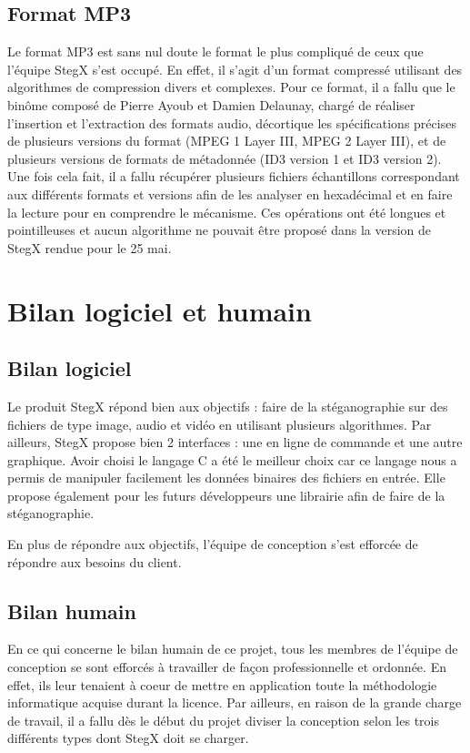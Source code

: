 \documentclass[11pt]{article}
\begin{document}
\subsection{Format MP3}

Le format MP3 est sans nul doute le format le plus compliqué de ceux que
l'équipe StegX s'est occupé. En effet, il s'agit d'un format compressé utilisant
des algorithmes de compression divers et complexes. Pour ce format, il a fallu
que le binôme composé de Pierre Ayoub et Damien Delaunay, chargé de réaliser
l'insertion et l'extraction des formats audio, décortique les spécifications
précises de plusieurs versions du format (MPEG 1 Layer III, MPEG 2 Layer III),
et de plusieurs versions de formats de métadonnée (ID3 version 1 et ID3 version
2). Une fois cela fait, il a fallu récupérer plusieurs fichiers échantillons
correspondant aux différents formats et versions afin de les analyser en
hexadécimal et en faire la lecture pour en comprendre le mécanisme. Ces
opérations ont été longues et pointilleuses et aucun algorithme ne pouvait être
proposé dans la version de StegX rendue pour le 25 mai. 

\section{Bilan logiciel et humain}

\subsection{Bilan logiciel}

Le produit StegX répond bien aux objectifs : faire de la stéganographie sur des
fichiers de type image, audio et vidéo en utilisant plusieurs algorithmes. Par
ailleurs, StegX propose bien 2 interfaces : une en ligne de commande et une
autre graphique. Avoir choisi le langage C a été le meilleur choix car ce
langage nous a permis de manipuler facilement les données binaires des fichiers
en entrée. Elle propose également pour les futurs développeurs une librairie 
afin de faire de la stéganographie. 

En plus de répondre aux objectifs, l'équipe de conception s'est efforcée 
de répondre aux besoins du client. 

\subsection{Bilan humain}

En ce qui concerne le bilan humain de ce projet, tous les membres de l'équipe 
de conception se sont efforcés à travailler de façon professionnelle et ordonnée. 
En effet, ils leur tenaient à coeur de mettre en application toute la méthodologie 
informatique acquise durant la licence. Par ailleurs, en raison de la grande 
charge de travail, il a fallu dès le début du projet diviser la conception 
selon les trois différents types dont StegX doit se charger.
\end{document}
